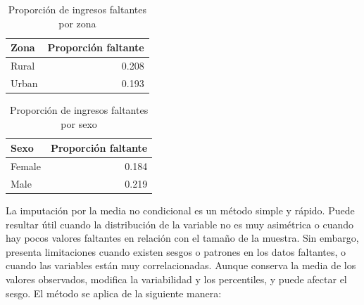 \documentclass[
  spanish,
  11pt,
  letterpaper,
  oneside,
  open=any]{scrbook}
\newenvironment{Shaded}{\begin{snugshade}}{\end{snugshade}}
\newcommand{\AttributeTok}[1]{\textcolor[rgb]{0.40,0.45,0.13}{#1}}
\newcommand{\ConstantTok}[1]{\textcolor[rgb]{0.56,0.35,0.01}{#1}}
\newcommand{\FunctionTok}[1]{\textcolor[rgb]{0.28,0.35,0.67}{#1}}
\newcommand{\NormalTok}[1]{\textcolor[rgb]{0.00,0.23,0.31}{#1}}
\newcommand{\OtherTok}[1]{\textcolor[rgb]{0.00,0.23,0.31}{#1}}
\newcommand{\SpecialCharTok}[1]{\textcolor[rgb]{0.37,0.37,0.37}{#1}}
\begin{document}
{

\begin{longtable}[]{@{}lr@{}}

\caption{\label{tbl-ap3-missing-zone}Proporción de ingresos faltantes
por zona}

\tabularnewline

\toprule\noalign{}
Zona & Proporción faltante \\
\midrule\noalign{}
\endhead
\bottomrule\noalign{}
\endlastfoot
Rural & 0.208 \\
Urban & 0.193 \\

\end{longtable}

}

{

\begin{longtable}[]{@{}lr@{}}

\caption{\label{tbl-ap3-missing-sex}Proporción de ingresos faltantes por
sexo}

\tabularnewline

\toprule\noalign{}
Sexo & Proporción faltante \\
\midrule\noalign{}
\endhead
\bottomrule\noalign{}
\endlastfoot
Female & 0.184 \\
Male & 0.219 \\

\end{longtable}

}

La imputación por la media no condicional es un método simple y rápido.
Puede resultar útil cuando la distribución de la variable no es muy
asimétrica o cuando hay pocos valores faltantes en relación con el
tamaño de la muestra. Sin embargo, presenta limitaciones cuando existen
sesgos o patrones en los datos faltantes, o cuando las variables están
muy correlacionadas. Aunque conserva la media de los valores observados,
modifica la variabilidad y los percentiles, y puede afectar el sesgo. El
método se aplica de la siguiente manera:

\begin{Shaded}
\end{Shaded}
\end{document}
